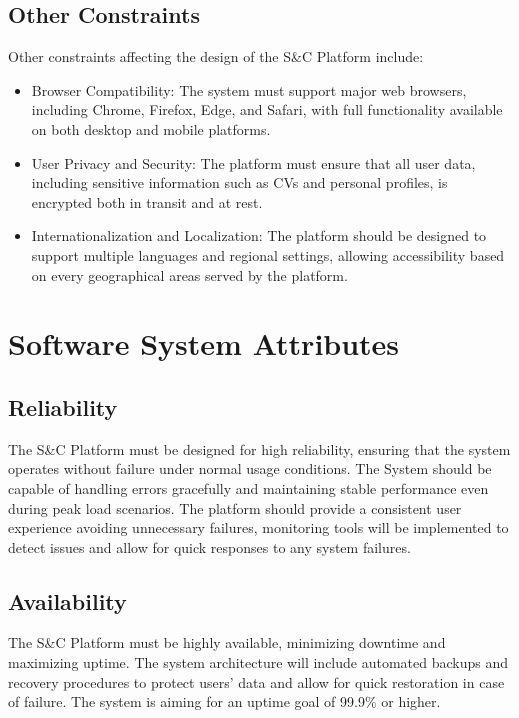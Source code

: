 \subsection{Other Constraints}
Other constraints affecting the design of the S\&C Platform include:
\begin {itemize}
\item Browser Compatibility: The system must support major web browsers, 
including Chrome, Firefox, Edge, and Safari, with full functionality 
available on both desktop and mobile platforms.
  
\item User Privacy and Security: The platform must ensure that all user data, 
including sensitive information such as CVs and personal profiles, 
is encrypted both in transit and at rest.
  
\item Internationalization and Localization: The platform should be designed 
to support multiple languages and regional settings, allowing accessibility
based on every geographical areas served by the platform.
\end {itemize}
\section{Software System Attributes}

\subsection{Reliability}
The S\&C Platform must be designed for high reliability, 
ensuring that the system operates without failure under normal usage conditions. 
The System should be capable of handling errors gracefully and maintaining stable performance even during peak load scenarios. 
The platform should provide a consistent user experience avoiding unnecessary failures, 
monitoring tools will be implemented to detect issues and allow for quick responses to any system failures.

\subsection{Availability}
The S\&C Platform must be highly available, 
minimizing downtime and maximizing uptime. 
The system architecture will include automated backups and recovery procedures to protect users' data 
and allow for quick restoration in case of failure. 
The system is aiming for an uptime goal of 99.9\% or higher.

